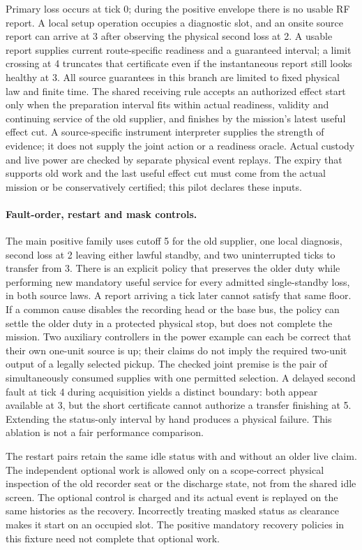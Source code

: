 \documentclass{article}
\begin{document}
Primary loss occurs at tick 0; during the positive envelope there is no usable RF report. A local setup operation occupies a diagnostic slot, and an onsite source report can arrive at 3 after observing the physical second loss at 2. A usable report supplies current route-specific readiness and a guaranteed interval; a limit crossing at 4 truncates that certificate even if the instantaneous report still looks healthy at 3. All source guarantees in this branch are limited to fixed physical law and finite time. The shared receiving rule accepts an authorized effect start only when the preparation interval fits within actual readiness, validity and continuing service of the old supplier, and finishes by the mission's latest useful effect cut. A source-specific instrument interpreter supplies the strength of evidence; it does not supply the joint action or a readiness oracle. Actual custody and live power are checked by separate physical event replays. The expiry that supports old work and the last useful effect cut must come from the actual mission or be conservatively certified; this pilot declares these inputs.

\paragraph{Fault-order, restart and mask controls.}
The main positive family uses cutoff 5 for the old supplier, one local diagnosis, second loss at 2 leaving either lawful standby, and two uninterrupted ticks to transfer from 3. There is an explicit policy that preserves the older duty while performing new mandatory useful service for every admitted single-standby loss, in both source laws. A report arriving a tick later cannot satisfy that same floor. If a common cause disables the recording head or the base bus, the policy can settle the older duty in a protected physical stop, but does not complete the mission. Two auxiliary controllers in the power example can each be correct that their own one-unit source is up; their claims do not imply the required two-unit output of a legally selected pickup. The checked joint premise is the pair of simultaneously consumed supplies with one permitted selection. A delayed second fault at tick 4 during acquisition yields a distinct boundary: both appear available at 3, but the short certificate cannot authorize a transfer finishing at 5. Extending the status-only interval by hand produces a physical failure. This ablation is not a fair performance comparison.

The restart pairs retain the same idle status with and without an older live claim. The independent optional work is allowed only on a scope-correct physical inspection of the old recorder seat or the discharge state, not from the shared idle screen. The optional control is charged and its actual event is replayed on the same histories as the recovery. Incorrectly treating masked status as clearance makes it start on an occupied slot. The positive mandatory recovery policies in this fixture need not complete that optional work.
\end{document}
